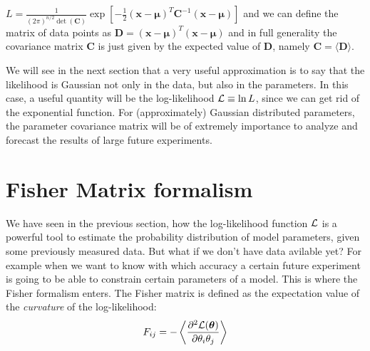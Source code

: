 \beeq$ \label{eq:moreGeneral-Gaussian-Likelihood}
L=\frac{1}{(2\pi)^{n/2} \det (\bm{C}) } \exp \left[-\frac{1}{2} 
(\bm{x}-\bm{\mu})^T \bm{C}^{-1} (\bm{x}-\bm{\mu}) \right]
$
and we can define the matrix of data points as $\bm{D} = (\bm{x}-\bm{\mu})^T  (\bm{x}-\bm{\mu}) $
and in full generality the covariance matrix $\bm C$ is just given by the expected value of $\bm D$, namely 
$\bm C = \langle \bm D \rangle $.

We will see in the next section that a very useful approximation is to say that the likelihood is Gaussian
not only in the data, but also in the parameters. In this case, a useful quantity will
be the log-likelihood $\mathcal{L} \equiv \ln L$, since we can get rid of the exponential function.
For (approximately) Gaussian distributed parameters, the parameter covariance matrix will be of extremely
importance to analyze and forecast the results of large future experiments.


\section{Fisher Matrix formalism}
We have seen in the previous section, how the log-likelihood function $\mathcal{L}$ is a powerful
tool to estimate the probability distribution of model parameters, given some previously measured data.
But what if we don't have data avilable yet? For example when we want to know 
with which accuracy a certain future experiment is going to be able to constrain certain parameters of
a model. 
This is where the Fisher formalism \cite{(cite Fisher, Tegmark, etc.)} enters.
The Fisher matrix is defined as the expectation value of the \emph{curvature} of the log-likelihood:
\begin{equation}\label{eq:Fishermatrix-definition}
F_{ij} = -\left< \frac{\partial^2 \mathcal{L}(\bm{\theta})}{\partial \theta_i \theta_j} \right>
\end{equation}

